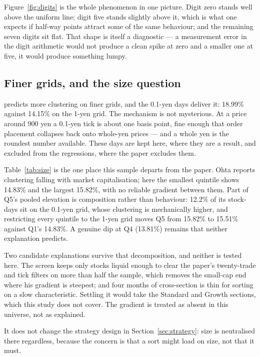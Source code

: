 Figure~\ref{fig:digits} is the whole phenomenon in one picture. Digit zero
stands well above the uniform line; digit five stands slightly above it, which is
what one expects if half-way points attract some of the same behaviour; and the
remaining seven digits sit flat. That shape is itself a diagnostic --- a
measurement error in the digit arithmetic would not produce a clean spike at zero
and a smaller one at five, it would produce something lumpy.

\subsection{Finer grids, and the size question}




\textcite{Harris1991Clustering} predicts more clustering on finer grids,
and the 0.1-yen days deliver it: 18.99\% against 14.15\% on the 1-yen grid. The mechanism is not mysterious.
At a price around 900 yen a 0.1-yen tick is about one basis point, fine enough
that order placement collapses back onto whole-yen prices --- and a whole yen is
the roundest number available. These days are kept here, where they are a
result, and excluded from the regressions, where the paper excludes them.

Table~\ref{tab:size} is the one place this sample departs from the paper. Ohta reports clustering falling with market capitalisation; here the smallest quintile shows 14.83\% and the largest 15.82\%, with no reliable gradient between them. Part of Q5's pooled elevation is composition rather than behaviour: 12.2\% of its stock-days sit on the 0.1-yen grid, whose clustering is mechanically higher, and restricting every quintile to the 1-yen grid moves Q5 from 15.82\% to 15.51\% against Q1's 14.83\%. A genuine dip at Q4 (13.81\%) remains that neither explanation predicts.

Two candidate explanations survive that decomposition, and neither is tested here. The screen keeps only stocks liquid enough to clear the paper's twenty-trade and tick filters on more than half the sample, which removes the small-cap end where his gradient is steepest; and four months of cross-section is thin for sorting on a slow characteristic. Settling it would take the Standard and Growth sections, which this study does not cover. The gradient is treated as absent in this universe, not as explained.

It does not change the strategy design in Section~\ref{sec:strategy}: size is neutralised there regardless, because the concern is that a sort might load on size, not that it must.

